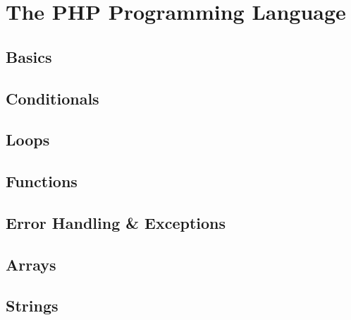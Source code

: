 \documentclass[12pt]{scrbook}
\begin{document}
\part{The PHP Programming Language}

\chapter{Basics}


\chapter{Conditionals}


\chapter{Loops}


\chapter{Functions}


\chapter{Error Handling \& Exceptions}
\label{chapter:php:errorHandling}


\chapter{Arrays}
\label{chapter:php:arrays}


\chapter{Strings}
\label{chapter:php:strings}


\backmatter

\newpage
\printglossaries
\forallglsentries{\thislabel}%
{%
  \ifglsused{\thislabel}{}{\glsadd[format=ignore]{\thislabel}}%
}

{}
\printindex
{}

{}
\nocite{*}

%

\end{document}
